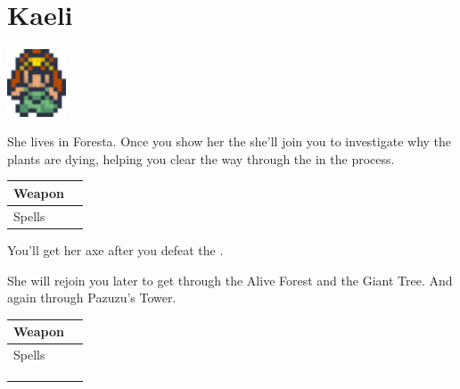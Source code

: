 \section{Kaeli}
\label{char:kaeli}

\includegraphics[height=2cm,keepaspectratio]{./resources/chars/kaeli}

She lives in Foresta. Once you show her the  she'll join you to investigate why the plants are dying, helping you clear the way through the  in the process.

\vspace{0.5em}
\begin{tabular}{ l | l }
	Weapon & \nameref{weapon:axe} \\
	\hline
	Spells & \nameref{spell:life}
\end{tabular}
\vspace{0.5em}

You'll get her axe after you defeat the .

\vspace{1em}

She will rejoin you later to get through the Alive Forest and the Giant Tree. And again through Pazuzu's Tower.

\vspace{0.5em}
\begin{tabular}{ l | l }
	Weapon & \nameref{weapon:giants_axe} \\
	\hline
	Spells & \nameref{spell:cure} \\
	& \nameref{spell:heal} \\
	& \nameref{spell:life} \\
	& \nameref{spell:aero}
\end{tabular}
\vspace{0.5em}

